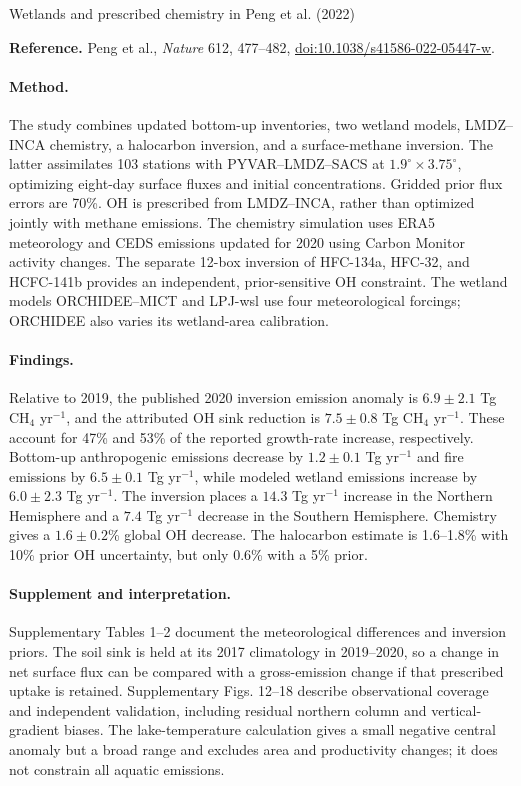 \documentclass[11pt]{article}
\begin{document}
\begin{center}\large Wetlands and prescribed chemistry in Peng et al. (2022)\end{center}
\noindent\textbf{Reference.} Peng et al., \emph{Nature} 612, 477--482,
\href{https://doi.org/10.1038/s41586-022-05447-w}{doi:10.1038/s41586-022-05447-w}.

\paragraph{Method.} The study combines updated bottom-up inventories, two wetland
models, LMDZ--INCA chemistry, a halocarbon inversion, and a surface-methane
inversion. The latter assimilates 103 stations with PYVAR--LMDZ--SACS at
$1.9^\circ\times3.75^\circ$, optimizing eight-day surface fluxes and initial
concentrations. Gridded prior flux errors are 70\%. OH is prescribed from
LMDZ--INCA, rather than optimized jointly with methane emissions. The chemistry
simulation uses ERA5 meteorology and CEDS emissions updated for 2020 using
Carbon Monitor activity changes. The separate 12-box inversion of HFC-134a,
HFC-32, and HCFC-141b provides an independent, prior-sensitive OH constraint.
The wetland models ORCHIDEE--MICT and LPJ-wsl use four meteorological forcings;
ORCHIDEE also varies its wetland-area calibration.

\paragraph{Findings.} Relative to 2019, the published 2020 inversion emission
anomaly is $6.9\pm2.1$ Tg CH$_4$ yr$^{-1}$, and the attributed OH sink reduction
is $7.5\pm0.8$ Tg CH$_4$ yr$^{-1}$. These account for 47\% and 53\% of the
reported growth-rate increase, respectively. Bottom-up anthropogenic emissions
decrease by $1.2\pm0.1$ Tg yr$^{-1}$ and fire emissions by $6.5\pm0.1$ Tg
yr$^{-1}$, while modeled wetland emissions increase by $6.0\pm2.3$ Tg yr$^{-1}$.
The inversion places a $14.3$ Tg yr$^{-1}$ increase in the Northern Hemisphere
and a $7.4$ Tg yr$^{-1}$ decrease in the Southern Hemisphere. Chemistry gives a
$1.6\pm0.2$\% global OH decrease. The halocarbon estimate is 1.6--1.8\% with
10\% prior OH uncertainty, but only 0.6\% with a 5\% prior.

\paragraph{Supplement and interpretation.} Supplementary Tables 1--2 document
the meteorological differences and inversion priors. The soil sink is held at
its 2017 climatology in 2019--2020, so a change in net surface flux can be compared
with a gross-emission change if that prescribed uptake is retained. Supplementary
Figs. 12--18 describe observational coverage and independent validation, including
residual northern column and vertical-gradient biases. The lake-temperature
calculation gives a small negative central anomaly but a broad range and excludes
area and productivity changes; it does not constrain all aquatic emissions.
\end{document}
